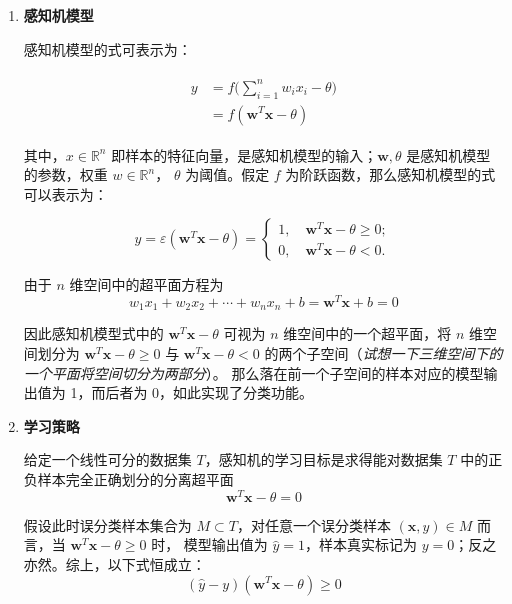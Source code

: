 \documentclass[../studies-ml.tex]{subfiles}
\begin{document}
\begin{enumerate}[I]
  \item \textbf{感知机模型}

        感知机模型的式可表示为：

        \begin{align*}
          \begin{split}
            y & = f \Biggl( \sum_{i=1}^{n} w_i x_i - \theta \Biggr) \\
            & = f(\pmb{w}^T \pmb{x} - \theta)
          \end{split}
        \end{align*}

        其中，$x \in \mathbb{R}^n$ 即样本的特征向量，是感知机模型的输入；$\pmb{w}, \theta$ 是感知机模型的参数，权重 $w \in \mathbb{R}^n$，
        $\theta$ 为阈值。假定 $f$ 为阶跃函数，那么感知机模型的式可以表示为：

        \begin{equation*}
          y = \varepsilon (\pmb{w}^T \pmb{x} - \theta) = \begin{cases}
            1,\quad \pmb{w}^T \pmb{x} - \theta \ge 0; \\
            0,\quad \pmb{w}^T \pmb{x} - \theta < 0.
          \end{cases}
        \end{equation*}

        由于 $n$ 维空间中的超平面方程为
        \[
          w_1 x_1 + w_2 x_2 + \cdots + w_n x_n + b = \pmb{w}^T \pmb{x} + b = 0
        \]

        因此感知机模型式中的 $\pmb{w}^T \pmb{x} - \theta$ 可视为 $n$ 维空间中的一个超平面，将 $n$ 维空间划分为 $\pmb{w}^T \pmb{x} - \theta \ge 0$
        与 $\pmb{w}^T \pmb{x} - \theta < 0$ 的两个子空间（\textit{试想一下三维空间下的一个平面将空间切分为两部分}）。
        那么落在前一个子空间的样本对应的模型输出值为 1，而后者为 0，如此实现了分类功能。

  \item \textbf{学习策略}

        给定一个线性可分的数据集 $T$，感知机的学习目标是求得能对数据集 $T$ 中的正负样本完全正确划分的分离超平面
        \[ \pmb{w}^T \pmb{x} - \theta = 0 \]

        假设此时误分类样本集合为 $M \subset T$，对任意一个误分类样本 $(\pmb{x},y) \in M$ 而言，当 $\pmb{w}^T \pmb{x} - \theta \ge 0$ 时，
        模型输出值为 $\hat{y} = 1$，样本真实标记为 $y = 0$；反之亦然。综上，以下式恒成立：
        \[ (\hat{y} - y)(\pmb{w}^T \pmb{x} - \theta) \ge 0 \]


\end{enumerate}
\end{document}
